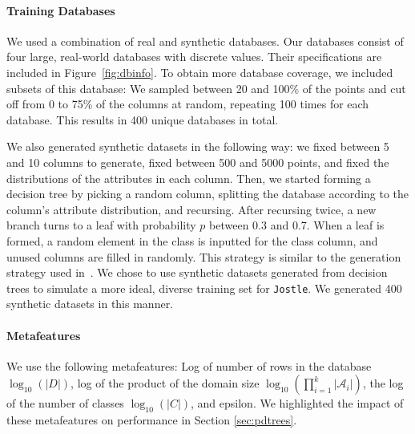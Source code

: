 \documentclass[11pt]{report}
\newcommand{\Jostle}{\texttt{Jostle}}
\begin{document}
\paragraph{Training Databases}
We used a combination of real and synthetic databases. Our databases consist of four large, real-world databases with discrete values. Their specifications are included in Figure~\ref{fig:dbinfo}. To obtain more database coverage, we included subsets of this database: We sampled between 20 and 100\% of the points and cut off from 0 to 75\% of the columns at random, repeating 100 times for each database. This results in 400 unique databases in total. 

We also generated synthetic datasets in the following way: we fixed between 5 and 10 columns to generate, fixed between 500 and 5000 points, and fixed the distributions of the attributes in each column. Then, we started forming a decision tree by picking a random column, splitting the database according to the column's attribute distribution, and recursing. After recursing twice, a new branch turns to a leaf with probability $p$ between 0.3 and 0.7. When a leaf is formed, a random element in the class is inputted for the class column, and unused columns are filled in randomly. This strategy is similar to the generation strategy used in~\cite{Friedman:2010}. We chose to use synthetic datasets generated from decision trees to simulate a more ideal, diverse training set for \Jostle{}. We generated 400 synthetic datasets in this manner.

\paragraph{Metafeatures} We use the following metafeatures: Log of number of rows in the database $\log_{10}(|D|)$, log of the product of the domain size $\log_{10}\left(\prod_{i=1}^k|\mathcal{A}_i|\right)$, the log of the number of classes $\log_{10}(|C|)$, and epsilon. We highlighted the impact of these metafeatures on performance in Section \ref{sec:pdtrees}.
\end{document}
